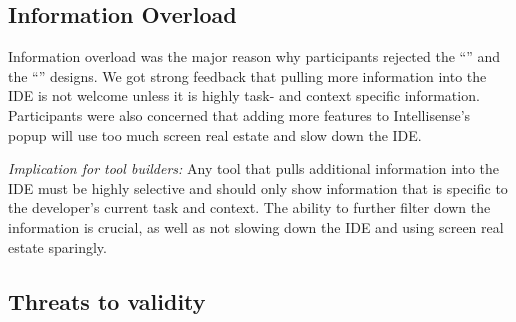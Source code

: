 \moarsauce
\subsection{Information Overload} 

Information overload was the major reason why participants rejected the ``\ZoomableUML'' and the ``\RichIntellisense'' designs. We got strong feedback that pulling more information into the IDE is not welcome unless it is highly task- and context specific information. Participants were also concerned that adding more features to Intellisense's popup will use too much screen real estate and slow down the IDE. 

\emph{Implication for tool builders:} Any tool that pulls additional information into the IDE must be highly selective and should only show information that is specific to the developer's current task and context. The ability to further filter down the information is crucial, as well as not slowing down the IDE and using screen real estate sparingly.





\moarsauce
\subsection{Threats to validity}

